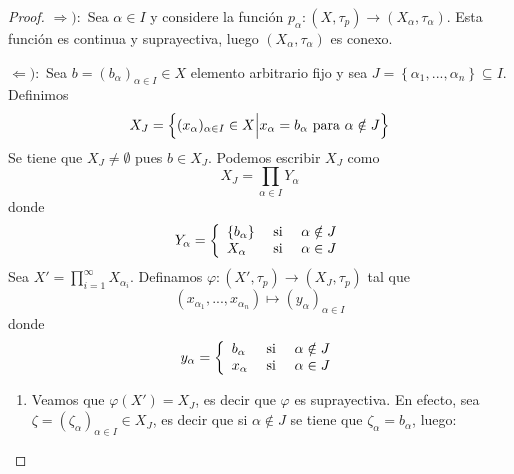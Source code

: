 \documentclass[12pt]{report}
\theoremstyle{largebreak}
\newcommand\cf[3]{\ensuremath{#1:#2\rightarrow#3}}
\begin{document}
    \begin{proof}
        $\Rightarrow):$ Sea $\alpha\in I$ y considere la función $\cf{p_\alpha}{(X,\tau_p)}{(X_\alpha,\tau_\alpha)}$. Esta función es continua y suprayectiva, luego $(X_\alpha,\tau_\alpha)$ es conexo.

        $\Leftarrow):$ Sea $b=(b_\alpha)_{\alpha\in I}\in X$ elemento arbitrario fijo y sea $J=\left\{\alpha_1,...,\alpha_n \right\}\subseteq I$. Definimos
        \begin{equation*}
            X_J=\left\{(x_\alpha)_{\alpha\in I}\in X\Big|x_\alpha=b_\alpha \textup{ para }\alpha\notin J \right\}
        \end{equation*}
        Se tiene que $X_J\neq\emptyset$ pues $b\in X_J$. Podemos escribir $X_J$ como
        \begin{equation*}
            X_J=\prod_{\alpha\in I}Y_\alpha
        \end{equation*}
        donde
        \begin{equation*}
            Y_\alpha=\left\{
                \begin{array}{lcr}
                    \left\{b_\alpha\right\} & \textup{ si } & \alpha\notin J\\
                    X_\alpha & \textup{ si } & \alpha\in J\\
                \end{array}
            \right.
        \end{equation*}
        Sea $X'=\prod_{i=1}^\infty X_{\alpha_i}$. Definamos $\cf{\varphi}{(X',\tau_p)}{(X_J,\tau_p)}$ tal que
        \begin{equation*}
            (x_{\alpha_1},...,x_{\alpha_n})\mapsto (y_\alpha)_{\alpha\in I}
        \end{equation*}
        donde
        \begin{equation*}
            y_\alpha=\left\{
                \begin{array}{lcr}
                    b_\alpha & \textup{ si } & \alpha\notin J\\
                    x_\alpha & \textup{ si } & \alpha\in J\\
                \end{array}
            \right.
        \end{equation*}
        \begin{enumerate}
            \item Veamos que $\varphi(X')=X_J$, es decir que $\varphi$ es suprayectiva. En efecto, sea $\zeta=(\zeta_{\alpha})_{\alpha\in I}\in X_J$, es decir que si $\alpha\notin J$ se tiene que $\zeta_\alpha=b_\alpha$, luego:

\end{enumerate}
\end{proof}
\end{document}
